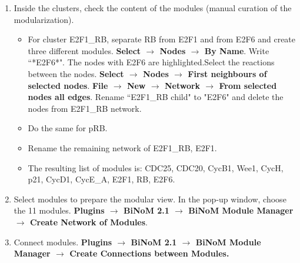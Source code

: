 \documentclass[a4paper,10pt]{article}
\begin{document}
\begin{enumerate}
\item	Inside the clusters, check the content of the modules (manual curation
of the modularization).

\begin{itemize}
\item	For cluster E2F1\_RB, separate RB from E2F1 and from E2F6 and create
three different modules. \textbf{Select $\rightarrow$ Nodes $\rightarrow$ By Name}. Write ``*E2F6*". The
nodes with E2F6 are highlighted.Select the reactions between the nodes.
\textbf{Select $\rightarrow$ Nodes $\rightarrow$ First neighbours of selected nodes}. \textbf{File $\rightarrow$ New
 $\rightarrow$ Network $\rightarrow$ From selected nodes all edges}. Rename ``E2F1\_RB child" to "E2F6" and delete the
nodes from E2F1\_RB network.
\item	Do the same for pRB.
\item	Rename the remaining network of E2F1\_RB, E2F1.
\item	The resulting list of modules is: CDC25, CDC20, CycB1, Wee1, CycH, p21, CycD1,
CycE\_A, E2F1, RB, E2F6.
\end{itemize}

\item	Select modules to prepare the modular view. In the pop-up window, choose
the 11 modules. \textbf{Plugins $\rightarrow$  BiNoM 2.1 $\rightarrow$ BiNoM Module Manager$\rightarrow$ Create Network of Modules}.
\item	Connect modules. \textbf{Plugins $\rightarrow$  BiNoM 2.1 $\rightarrow$ BiNoM Module Manager $\rightarrow$ Create Connections between Modules.}


\end{enumerate}
 

\end{document}
